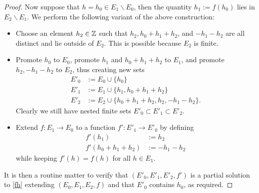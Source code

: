 \begin{proof}
Now suppose that $h = h_0 \in E_1 \backslash E_0$, then the quantity $h_1 := f(h_0)$ lies in $E_2 \backslash E_1$.  We perform the following variant of the above construction:
\begin{itemize}
\item Choose an element $h_2 \in \mathbb{Z}$ such that $h_2, h_0+h_1+h_2$, and $-h_1-h_2$ are all distinct and lie outside of $E_2$.  This is possible because $E_2$ is finite.
\item Promote $h_0$ to $E_0$, promote $h_1$ and $h_0+h_1+h_2$ to $E_1$, and promote $h_2, -h_1-h_2$ to $E_2$, thus creating new sets
\begin{align*}
  E'_0 &:= E_0 \cup \{h_0\} \\
  E'_1 &:= E_1 \cup \{h_1, h_0+h_1+h_2\} \\
  E'_2 &:= E_2 \cup \{h_0+h_1+h_2, h_2, -h_1-h_2\}.
\end{align*}
Clearly we still have nested finite sets $E'_0 \subset E'_1 \subset E'_2$.
\item Extend $f : E_1 \to E_0$ to a function $f': E'_1 \to E'_0$ by defining
\begin{align*}
  f'(h_1) &:= h_2 \\
  f'(h_0+h_1+h_2) &:= -h_1-h_2
\end{align*}
while keeping $f'(h)=f(h)$ for all $h \in E_1$.
\end{itemize}
It is then a routine matter to verify that $(E'_0,E'_1,E'_2,f')$ is a partial solution to \eqref{fh} extending $(E_0,E_1,E_2,f)$ and that $E'_0$ contains $h_0$, as required.


\end{proof}
